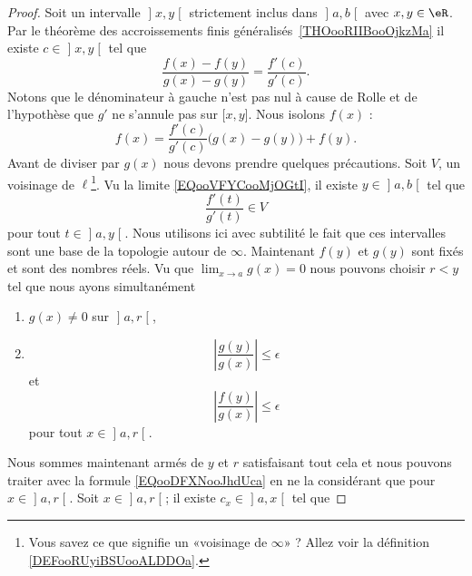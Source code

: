 \begin{proof}
	Soit un intervalle \( \mathopen] x , y \mathclose[\) strictement inclus dans \( \mathopen] a , b \mathclose[\) avec \( x,y\in\eR\). Par le théorème des accroissements finis généralisés~\ref{THOooRIIBooOjkzMa} il existe \( c\in \mathopen] x , y \mathclose[\) tel que
		\begin{equation}
			\frac{ f(x)-f(y) }{ g(x)-g(y) }=\frac{ f'(c) }{ g'(c) }.
		\end{equation}
		Notons que le dénominateur à gauche n'est pas nul à cause de Rolle et de l'hypothèse que \( g'\) ne s'annule pas sur \( \mathopen[ x , y \mathclose]\). Nous isolons \( f(x)\) :
		\begin{equation}        \label{EQooDFXNooJhdUca}
			f(x)=\frac{ f'(c) }{ g'(c) }\Big( g(x)-g(y) \Big)+f(y).
		\end{equation}
		Avant de diviser par \( g(x)\) nous devons prendre quelques précautions. Soit \( V\), un voisinage de \( \ell\)\footnote{Vous savez ce que signifie un «voisinage de \( \infty\)» ? Allez voir la définition \ref{DEFooRUyiBSUooALDDOa}.}. Vu la limite \eqref{EQooVFYCooMjOGtI}, il existe \( y\in \mathopen] a , b \mathclose[\) tel que
		\begin{equation}
			\frac{ f'(t) }{ g'(t) }\in V
		\end{equation}
		pour tout \( t\in \mathopen] a , y \mathclose[\). Nous utilisons ici avec subtilité le fait que ces intervalles sont une base de la topologie autour de \( \infty\). Maintenant \( f(y)\) et \( g(y)\) sont fixés et sont des nombres réels. Vu que \( \lim_{x\to a} g(x)=0\) nous pouvons choisir \( r<y\) tel que nous ayons simultanément
		\begin{enumerate}
			\item
			      \( g(x)\neq 0\) sur \( \mathopen] a , r \mathclose[\),
			\item
			      \begin{equation}
				      | \frac{ g(y) }{ g(x) } |\leq \epsilon
			      \end{equation}
			      et
			      \begin{equation}
				      | \frac{ f(y) }{ g(x) } |\leq \epsilon
			      \end{equation}
			      pour tout \( x\in \mathopen] a , r \mathclose[\).
		\end{enumerate}
		Nous sommes maintenant armés de \( y\) et \( r\) satisfaisant tout cela et nous pouvons traiter avec la formule \eqref{EQooDFXNooJhdUca} en ne la considérant que pour \( x\in \mathopen] a , r \mathclose[\). Soit \( x\in \mathopen] a , r \mathclose[\); il existe \( c_x\in \mathopen] a , x \mathclose[\) tel que

\end{proof}
